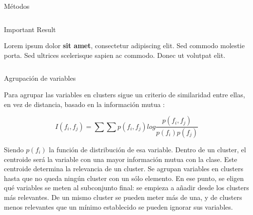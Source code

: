 \documentclass[final]{beamer}
\newlength{\onecolwid}
\newlength{\twocolwid}
\begin{document}
\begin{frame}[t]
\begin{columns}[t]
\begin{column}{\twocolwid}
\begin{columns}[t,totalwidth=\twocolwid]
\begin{column}{\onecolwid}
\begin{block}{Métodos}
\end{block}


\end{column} %

\end{columns} %


\begin{alertblock}{Important Result}

Lorem ipsum dolor \textbf{sit amet}, consectetur adipiscing elit. Sed commodo molestie porta. Sed ultrices scelerisque sapien ac commodo. Donec ut volutpat elit.

\end{alertblock} 


\begin{columns}[t,totalwidth=\twocolwid] %

\begin{column}{\onecolwid} %


\begin{block}{Agrupación de variables}

Para agrupar las variables en clusters sigue un criterio de similaridad entre ellas, en vez de distancia, basado en la información mutua \cite{cover1991}:
  
\begin{equation}
I(f_{i},f_{j}) = \sum \sum p(f_{i},f_{j}) log \frac{p(f_{i},f_{j})}{p(f_{i})p(f_{j})}
\label{eqn:MI}
\end{equation}

Siendo $p(f_i)$ la función de distribución de esa variable. Dentro de un cluster, el centroide será la variable con una mayor información mutua con la clase. Este centroide determina la relevancia de un cluster.
\newline
\newline
Se agrupan variables en clusters hasta que no queda ningún cluster con un sólo elemento. En ese punto, se eligen qué variables se meten al subconjunto final: se empieza a añadir desde los clusters más relevantes. De un mismo cluster se pueden meter más de una, y de clusters menos relevantes que un mínimo establecido se pueden ignorar sus variables.


\end{block}
\end{column}
\end{columns}
\end{column}
\end{columns}
\end{frame}
\end{document}
